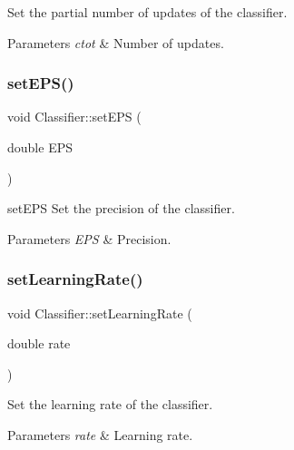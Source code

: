 Set the partial number of updates of the classifier. 


\begin{DoxyParams}{Parameters}
{\em ctot} & Number of updates. \\
\hline
\end{DoxyParams}
\mbox{\label{class_classifier_a9cc5a1d92243f9d9b530347be1ac7367}} 
\subsubsection{\texorpdfstring{set\+E\+P\+S()}{setEPS()}}
{\footnotesize\ttfamily void Classifier\+::set\+E\+PS (\begin{DoxyParamCaption}\item[{double}]{E\+PS }\end{DoxyParamCaption})}



set\+E\+PS Set the precision of the classifier. 


\begin{DoxyParams}{Parameters}
{\em E\+PS} & Precision. \\
\hline
\end{DoxyParams}
\mbox{\label{class_classifier_a8f6818bd403afbb46d1bfd75c9731ab6}} 
\subsubsection{\texorpdfstring{set\+Learning\+Rate()}{setLearningRate()}}
{\footnotesize\ttfamily void Classifier\+::set\+Learning\+Rate (\begin{DoxyParamCaption}\item[{double}]{rate }\end{DoxyParamCaption})}



Set the learning rate of the classifier. 


\begin{DoxyParams}{Parameters}
{\em rate} & Learning rate. \\
\hline
\end{DoxyParams}
\mbox{\label{class_classifier_a58540f77a22c0f1774d0089fac713498}} 
